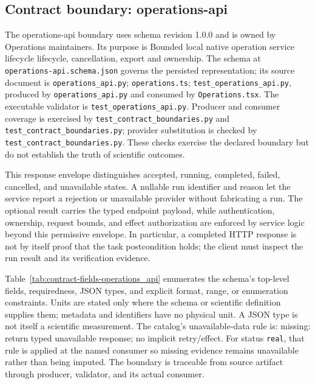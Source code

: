 \subsection{Contract boundary: operations-api}\label{sec:contract-operations_api}
The operations-api boundary uses schema revision 1.0.0 and is owned by Operations maintainers. Its purpose is Bounded local native operation service lifecycle lifecycle, cancellation, export and ownership. The schema at \texttt{operations-api.schema.json} governs the persisted representation; its source document is \texttt{operations\_\allowbreak{}api.py}; \texttt{operations.ts}; \texttt{test\_\allowbreak{}operations\_\allowbreak{}api.py}, produced by \texttt{operations\_\allowbreak{}api.py} and consumed by \texttt{Operations.tsx}. The executable validator is \texttt{test\_\allowbreak{}operations\_\allowbreak{}api.py}. Producer and consumer coverage is exercised by \texttt{test\_\allowbreak{}contract\_\allowbreak{}boundaries.py} and \texttt{test\_\allowbreak{}contract\_\allowbreak{}boundaries.py}; provider substitution is checked by \texttt{test\_\allowbreak{}contract\_\allowbreak{}boundaries.py}. These checks exercise the declared boundary but do not establish the truth of scientific outcomes.

This response envelope distinguishes accepted, running, completed, failed, cancelled, and unavailable states. A nullable run identifier and reason let the service report a rejection or unavailable provider without fabricating a run. The optional result carries the typed endpoint payload, while authentication, ownership, request bounds, and effect authorization are enforced by service logic beyond this permissive envelope. In particular, a completed HTTP response is not by itself proof that the task postcondition holds; the client must inspect the run result and its verification evidence.

Table~\ref{tab:contract-fields-operations_api} enumerates the schema's top-level fields, requiredness, JSON types, and explicit format, range, or enumeration constraints. Units are stated only where the schema or scientific definition supplies them; metadata and identifiers have no physical unit. A JSON type is not itself a scientific measurement. The catalog's unavailable-data rule is: missing: return typed unavailable response; no implicit retry/effect. For status \texttt{real}, that rule is applied at the named consumer so missing evidence remains unavailable rather than being imputed. The boundary is traceable from source artifact through producer, validator, and its actual consumer.

